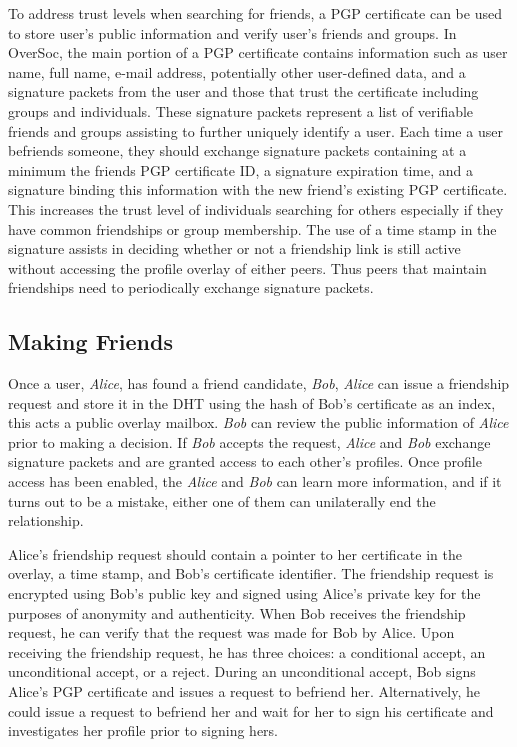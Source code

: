 \documentclass{IEEEtran}
\begin{document}
To address trust levels when searching for friends, a PGP certificate can be
used to store user's public information and verify user's friends and groups.
In OverSoc, the main portion of a PGP certificate contains information such as
user name, full name, e-mail address, potentially other user-defined data, and
a signature packets from the user and those that trust the certificate
including groups and individuals.  These signature packets represent a list of
verifiable friends and groups assisting to further uniquely identify a user.
Each time a user befriends someone, they should exchange signature packets
containing at a minimum the friends PGP certificate ID, a signature expiration
time, and a signature binding this information with the new friend's existing
PGP certificate.  This increases the trust level of individuals searching for
others especially if they have common friendships or group membership.  The use
of a time stamp in the signature assists in deciding whether or not a
friendship link is still active without accessing the profile overlay of either
peers.  Thus peers that maintain friendships need to periodically exchange
signature packets.

\subsection{Making Friends}

Once a user, \textit{Alice}, has found a friend candidate, \textit{Bob},
\textit{Alice} can issue a friendship request and store it in the DHT using the
hash of Bob's certificate as an index, this acts a public overlay mailbox.
\textit{Bob} can review the public information of \textit{Alice} prior to
making a decision.  If \textit{Bob} accepts the request, \textit{Alice} and
\textit{Bob} exchange signature packets and are granted access to each other's
profiles.  Once profile access has been enabled, the \textit{Alice} and
\textit{Bob} can learn more information, and if it turns out to be a mistake,
either one of them can unilaterally end the relationship.

Alice's friendship request should contain a pointer to her certificate in the
overlay, a time stamp, and Bob's certificate identifier.  The friendship
request is encrypted using Bob's public key and signed using Alice's private
key for the purposes of anonymity and authenticity.  When Bob receives the
friendship request, he can verify that the request was made for Bob by Alice.
Upon receiving the friendship request, he has three choices:  a conditional
accept, an unconditional accept, or a reject.  During an unconditional accept,
Bob signs Alice's PGP certificate and issues a request to befriend her.
Alternatively, he could issue a request to befriend her and wait for her to
sign his certificate and investigates her profile prior to signing hers.
\end{document}
